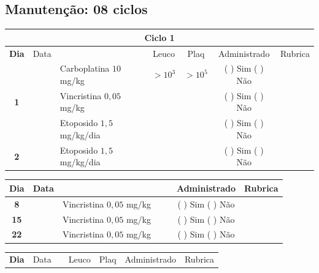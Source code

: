 \documentclass[11pt,a4paper,oldfontcommands]{memoir}
\begin{document}
\subsection{Manutenção: 08 ciclos}
\begin{center}
\begin{table}[H] \small
\begin{tabular}{p{1cm}c|p{4.8cm}|p{1.8cm}p{1.8cm}|c|c}
	\hline
	\multicolumn{7}{c}{Ciclo 1} \\
	\hline
	\multicolumn{1}{c|}{\multirow{1}{*}{\textbf{Dia}}}&{Data}&{}&\multicolumn{1}{c|}{Leuco}&\multicolumn{1}{c|}{Plaq}&{Administrado}&{Rubrica} \\
    \hline
    \multicolumn{1}{c|}{\multirow{3}{*}{\textbf{1}}}&\multirow{2}{*}{}&{Carboplatina \(10\) mg/kg}&\multicolumn{1}{c|}{\(>10^3\)}&\multicolumn{1}{c|}{\(>10^5\)}&{(  ) Sim (  ) Não}&\\
    \cline{4-5}
    \multicolumn{1}{c|}{}&&{Vincristina \(0,05\) mg/kg}&\multicolumn{1}{c|}{}&&{(  ) Sim (  ) Não}&\\
    \cline{4-5}
    \multicolumn{1}{c|}{}&\multirow{1}{*}{}&{Etoposido \(1,5\) mg/kg/dia}&{}&&{(  ) Sim (  ) Não}&\\
    \cline{1-3}\cline{6-6}
    \multicolumn{1}{c|}{\textbf{2}}&\multirow{1}{*}{}&{Etoposido \(1,5\) mg/kg/dia}&{}&&{(  ) Sim (  ) Não}&\\
    \hline
\end{tabular}
\end{table}
\begin{table}[H] \small
\begin{tabular}{p{1cm}c|p{4.8cm}|p{1.8cm}p{1.8cm}|c|c}
	\hline
	\multicolumn{1}{c|}{\multirow{1}{*}{\textbf{Dia}}}&{Data}&{}&{}&&{Administrado}&{Rubrica} \\
    \hline
    \multicolumn{1}{c|}{\textbf{8}}&&{Vincristina \(0,05\) mg/kg}&\multicolumn{1}{c}{}&&{(  ) Sim (  ) Não}&\\
    \hline
    \multicolumn{1}{c|}{\textbf{15}}&&{Vincristina \(0,05\) mg/kg}&\multicolumn{1}{c}{}&&{(  ) Sim (  ) Não}&\\
    \hline
    \multicolumn{1}{c|}{\textbf{22}}&&{Vincristina \(0,05\) mg/kg}&\multicolumn{1}{c}{}&&{(  ) Sim (  ) Não}&\\
    \hline
\end{tabular}
\end{table}
\begin{table}[H] \small
\begin{tabular}{p{1cm}c|p{4.8cm}|p{1.8cm}p{1.8cm}|c|c}
	\hline
	\multicolumn{1}{c|}{\multirow{1}{*}{\textbf{Dia}}}&{Data}&{}&\multicolumn{1}{c|}{Leuco}&\multicolumn{1}{c|}{Plaq}&{Administrado}&{Rubrica} \\

\end{tabular}
\end{table}
\end{center}
\end{document}
